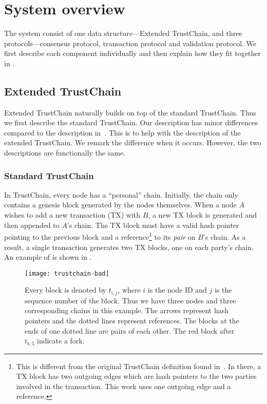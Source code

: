 \section{System overview}
\label{sec:system-overview}
The system consist of one data structure---Extended TrustChain,
and three protocols---consensus protocol, transaction protocol and validation protocol.
We first describe each component individually and then explain how they fit together in .

\subsection{Extended TrustChain}
Extended TrustChain naturally builds on top of the standard TrustChain. 
Thus we first describe the standard TrustChain.
Our description has minor differences compared to the description in~\cite{trustchain}.
This is to help with the description of the extended TrustChain.
We remark the difference when it occurs.
However, the two descriptions are functionally the same.

\subsubsection*{Standard TrustChain}
In TrustChain, every node has a ``personal'' chain. 
Initially, the chain only contains a genesis block generated by the nodes themselves.
When a node $A$ wishes to add a new transaction (TX) with $B$, a new TX block is generated and then appended to $A$'s chain.
The TX block must have a valid hash pointer pointing to the previous block
and a reference\footnote{This is different from the original TrustChain definition found in~\cite{trustchain}.
In there, a TX block has two outgoing edges which are hash pointers to the two parties involved in the transaction.
This work uses one outgoing edge and a reference.} to its \emph{pair} on $B$'s chain.
As a result, a single transaction generates two TX blocks, one on each party's chain.
An example of is shown in .

\begin{figure}
    \texttt{[image: trustchain-bad]}
    \centering
    \caption{Every block is denoted by $t_{i,j}$, where $i$ is the node ID and $j$ is the sequence number of the block.
    Thus we have three nodes and three corresponding chains in this example.
    The arrows represent hash pointers and the dotted lines represent references.
    The blocks at the ends of one dotted line are pairs of each other.
    The red block after $t_{b, 5}$ indicate a fork.}
    \label{fig:trustchain-bad}
\end{figure}

